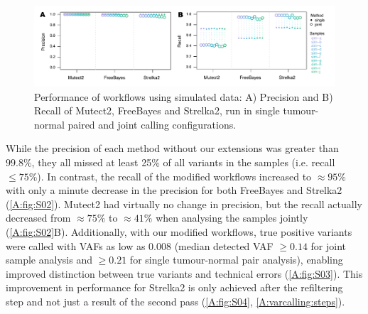 \begin{figure}[hbt]
\centering
  \includegraphics[width=\textwidth]{Appendices/Variantcalling/supp/S2}
  \caption[Performance of workflows using simulated data]{Performance of workflows using simulated data: A) Precision and B) Recall of Mutect2, FreeBayes and Strelka2, run in single tumour-normal paired and joint calling configurations.}\label{A:fig:S02}
\end{figure}

While the precision of each method without our extensions was greater than $99.8\%$, they all missed at least 25\% of all variants in the samples (i.e. recall $\leq 75\%$). In contrast, the recall of the modified workflows increased to $\approx 95\%$ with only a minute decrease in the precision for both FreeBayes and Strelka2 (\autoref{A:fig:S02}). Mutect2 had virtually no change in precision, but the recall actually decreased from $\approx 75\%$ to $\approx 41\%$ when analysing the samples jointly (\autoref{A:fig:S02}B). Additionally, with our modified workflows, true positive variants were called with VAFs as low as 0.008 (median detected VAF $\geq 0.14$ for joint sample analysis and $\geq 0.21$ for single tumour-normal pair analysis), enabling improved distinction between true variants and technical errors (\autoref{A:fig:S03}). This improvement in performance for Strelka2 is only achieved after the refiltering step and not just a result of the second pass (\autoref{A:fig:S04}, \autoref{A:varcalling:steps}).


